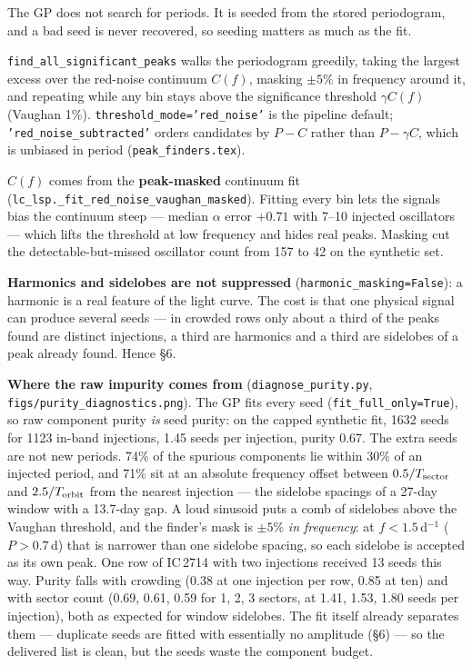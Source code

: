 \documentclass[11pt]{article}
\newcommand{\code}[1]{\texttt{#1}}
\begin{document}
The GP does not search for periods. It is seeded from the stored periodogram, and a bad seed
is never recovered, so seeding matters as much as the fit.

\code{find\_all\_significant\_peaks} walks the periodogram greedily, taking the largest
excess over the red-noise continuum $C(f)$, masking $\pm5\%$ in frequency around it, and
repeating while any bin stays above the significance threshold $\gamma C(f)$ (Vaughan 1\%).
\code{threshold\_mode='red\_noise'} is the pipeline default; \code{'red\_noise\_subtracted'}
orders candidates by $P - C$ rather than $P - \gamma C$, which is unbiased in period
(\code{peak\_finders.tex}).

$C(f)$ comes from the \textbf{peak-masked} continuum fit
(\code{lc\_lsp.\_fit\_red\_noise\_vaughan\_masked}). Fitting every bin lets the signals bias
the continuum steep --- median $\alpha$ error $+0.71$ with 7--10 injected oscillators --- which
lifts the threshold at low frequency and hides real peaks. Masking cut the
detectable-but-missed oscillator count from 157 to 42 on the synthetic set.

\textbf{Harmonics and sidelobes are not suppressed} (\code{harmonic\_masking=False}): a
harmonic is a real feature of the light curve. The cost is that one physical signal can
produce several seeds --- in crowded rows only about a third of the peaks found are distinct
injections, a third are harmonics and a third are sidelobes of a peak already found. Hence
\S6.

\textbf{Where the raw impurity comes from} (\code{diagnose\_purity.py},
\code{figs/purity\_diagnostics.png}). The GP fits every seed (\code{fit\_full\_only=True}), so
raw component purity \emph{is} seed purity: on the capped synthetic fit, 1632 seeds for 1123
in-band injections, 1.45 seeds per injection, purity 0.67. The extra seeds are not new
periods. 74\% of the spurious components lie within 30\% of an injected period, and 71\%
sit at an absolute frequency offset between $0.5/T_{\rm sector}$ and $2.5/T_{\rm orbit}$
from the nearest injection --- the sidelobe spacings of a 27-day window with a 13.7-day gap.
A loud sinusoid puts a comb of sidelobes above the Vaughan threshold, and the finder's
mask is $\pm 5\%$ \emph{in frequency}: at $f < 1.5$\,d$^{-1}$ ($P > 0.7$\,d) that is narrower
than one sidelobe spacing, so each sidelobe is accepted as its own peak. One row of IC\,2714
with two injections received 13 seeds this way. Purity falls with crowding (0.38 at one
injection per row, 0.85 at ten) and with sector count (0.69, 0.61, 0.59 for 1, 2, 3
sectors, at 1.41, 1.53, 1.80 seeds per injection), both as expected for window sidelobes.
The fit itself already separates them --- duplicate seeds are fitted with essentially no
amplitude (\S6) --- so the delivered list is clean, but the seeds waste the component
budget.
\end{document}
